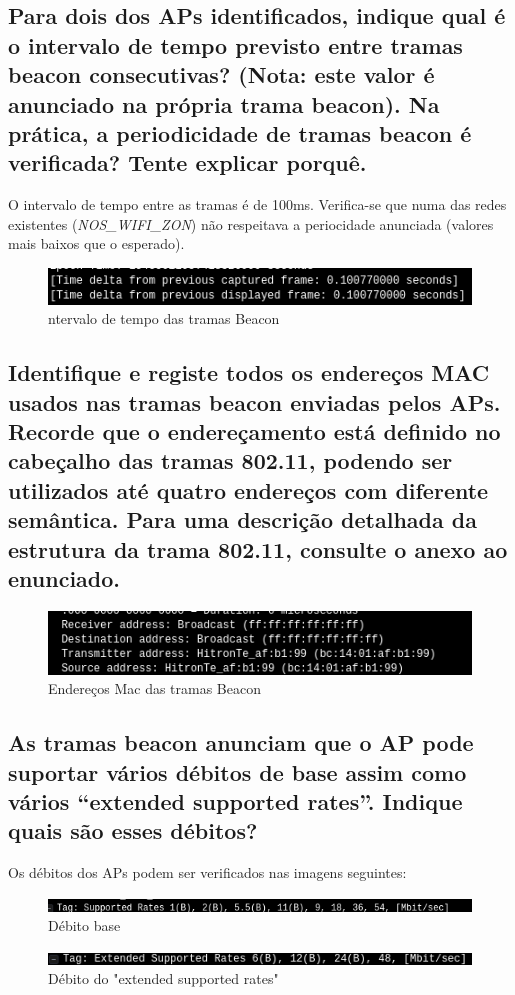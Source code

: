 \documentclass[a4paper]{article}
\begin{document}
\subsection{Para dois dos APs identificados, indique qual é o intervalo de tempo previsto
entre tramas beacon consecutivas?	 	 (Nota: este valor é anunciado na própria
trama beacon). Na prática, a periodicidade de tramas beacon é verificada? Tente
explicar porquê.}
O intervalo de tempo entre as tramas é de 100ms. Verifica-se que numa das redes existentes (\textit{NOS\_WIFI\_ZON}) não respeitava a periocidade anunciada (valores mais baixos que o esperado).
\begin{figure}[H]
\centering
\includegraphics[scale=0.50]{pics/p7.png}
\caption{ntervalo de tempo das tramas Beacon}
\end{figure}

\subsection{Identifique e registe todos os endereços MAC usados nas tramas beacon
enviadas pelos APs. Recorde que o endereçamento está definido no cabeçalho
das tramas 802.11, podendo ser utilizados até quatro endereços com diferente
semântica.	 	 Para uma descrição detalhada da estrutura da trama 802.11,
consulte o anexo ao enunciado.}

\begin{figure}[H]
\centering
\includegraphics[scale=0.50]{pics/p8.png}
\caption{Endereços Mac das tramas Beacon}
\end{figure}



\subsection{As tramas beacon anunciam que o AP pode suportar vários débitos de base
assim como vários “extended supported rates”.		Indique quais são esses débitos?}
Os débitos dos APs podem ser verificados nas imagens seguintes:
\begin{figure}[H]
\centering
\includegraphics[scale=0.60]{pics/p91.png}
\caption{Débito base}
\end{figure}
\begin{figure}[H]
\centering
\includegraphics[scale=0.60]{pics/p9.png}
\caption{Débito do "extended supported rates"}
\end{figure}
\end{document}
